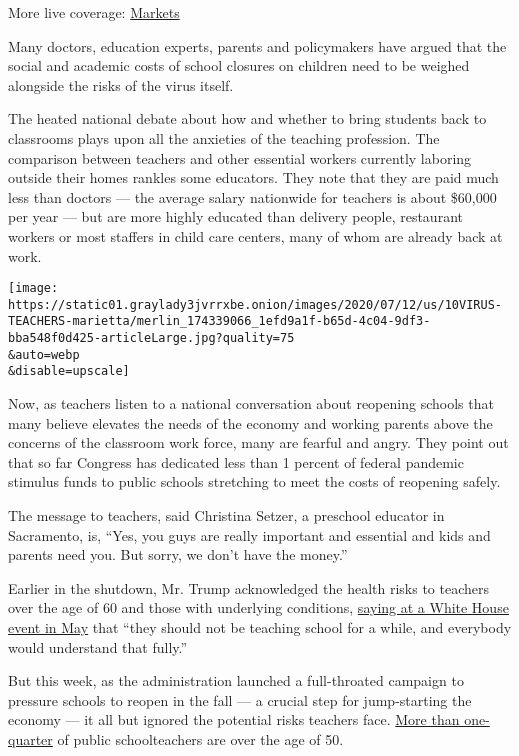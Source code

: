 More live coverage:
\href{https://www.nytimes3xbfgragh.onion/live/2020/08/04/business/stock-market-today-coronavirus?action=click\&pgtype=Article\&state=default\&region=MAIN_CONTENT_1\&context=storylines_live_updates}{Markets}

Many doctors, education experts, parents and policymakers have argued
that the social and academic costs of school closures on children need
to be weighed alongside the risks of the virus itself.

The heated national debate about how and whether to bring students back
to classrooms plays upon all the anxieties of the teaching profession.
The comparison between teachers and other essential workers currently
laboring outside their homes rankles some educators. They note that they
are paid much less than doctors --- the average salary nationwide for
teachers is about \$60,000 per year --- but are more highly educated
than delivery people, restaurant workers or most staffers in child care
centers, many of whom are already back at work.

\texttt{[image: https://static01.graylady3jvrrxbe.onion/images/2020/07/12/us/10VIRUS-TEACHERS-marietta/merlin\_174339066\_1efd9a1f-b65d-4c04-9df3-bba548f0d425-articleLarge.jpg?quality=75\\\&auto=webp\\\&disable=upscale]}

Now, as teachers listen to a national conversation about reopening
schools that many believe elevates the needs of the economy and working
parents above the concerns of the classroom work force, many are fearful
and angry. They point out that so far Congress has dedicated less than 1
percent of federal pandemic stimulus funds to public schools stretching
to meet the costs of reopening safely.

The message to teachers, said Christina Setzer, a preschool educator in
Sacramento, is, ``Yes, you guys are really important and essential and
kids and parents need you. But sorry, we don't have the money.''

Earlier in the shutdown, Mr. Trump acknowledged the health risks to
teachers over the age of 60 and those with underlying conditions,
\href{https://www.whitehouse.gov/briefings-statements/remarks-president-trump-signing-proclamation-honor-national-nurses-day/}{saying
at a White House event in May} that ``they should not be teaching school
for a while, and everybody would understand that fully.''

But this week, as the administration launched a full-throated campaign
to pressure schools to reopen in the fall --- a crucial step for
jump-starting the economy --- it all but ignored the potential risks
teachers face. \href{https://nces.ed.gov/pubs2020/2020142.pdf}{More than
one-quarter} of public schoolteachers are over the age of 50.

